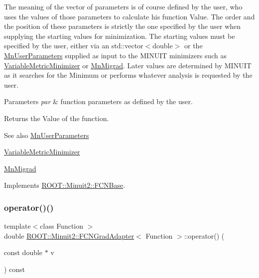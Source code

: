 The meaning of the vector of parameters is of course defined by the user, who uses the values of those parameters to calculate his function Value. The order and the position of these parameters is strictly the one specified by the user when supplying the starting values for minimization. The starting values must be specified by the user, either via an std\+::vector$<$double$>$ or the \mbox{\hyperlink{classROOT_1_1Minuit2_1_1MnUserParameters}{Mn\+User\+Parameters}} supplied as input to the M\+I\+N\+U\+IT minimizers such as \mbox{\hyperlink{classROOT_1_1Minuit2_1_1VariableMetricMinimizer}{Variable\+Metric\+Minimizer}} or \mbox{\hyperlink{classROOT_1_1Minuit2_1_1MnMigrad}{Mn\+Migrad}}. Later values are determined by M\+I\+N\+U\+IT as it searches for the Minimum or performs whatever analysis is requested by the user.


\begin{DoxyParams}{Parameters}
{\em par} & function parameters as defined by the user.\\
\hline
\end{DoxyParams}
\begin{DoxyReturn}{Returns}
the Value of the function.
\end{DoxyReturn}
\begin{DoxySeeAlso}{See also}
\mbox{\hyperlink{classROOT_1_1Minuit2_1_1MnUserParameters}{Mn\+User\+Parameters}} 

\mbox{\hyperlink{classROOT_1_1Minuit2_1_1VariableMetricMinimizer}{Variable\+Metric\+Minimizer}} 

\mbox{\hyperlink{classROOT_1_1Minuit2_1_1MnMigrad}{Mn\+Migrad}} 
\end{DoxySeeAlso}


Implements \mbox{\hyperlink{classROOT_1_1Minuit2_1_1FCNBase_ae4a86bd94d0d0f5ca6fc8f8ab2bb43cd}{R\+O\+O\+T\+::\+Minuit2\+::\+F\+C\+N\+Base}}.

\mbox{\label{classROOT_1_1Minuit2_1_1FCNGradAdapter_a3e3916bd20059d8e4a3f4938864ac2d7}} 
\subsubsection{\texorpdfstring{operator()()}{operator()()}\hspace{0.1cm}{\footnotesize\ttfamily [4/6]}}
{\footnotesize\ttfamily template$<$class Function $>$ \\
double \mbox{\hyperlink{classROOT_1_1Minuit2_1_1FCNGradAdapter}{R\+O\+O\+T\+::\+Minuit2\+::\+F\+C\+N\+Grad\+Adapter}}$<$ Function $>$\+::operator() (\begin{DoxyParamCaption}\item[{const double $\ast$}]{v }\end{DoxyParamCaption}) const\hspace{0.3cm}{\ttfamily [inline]}}

